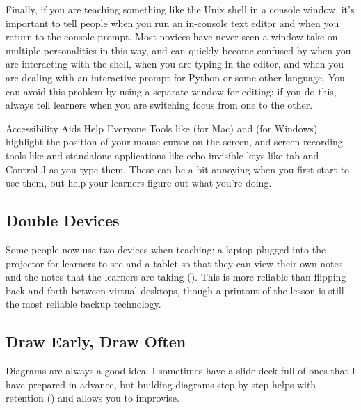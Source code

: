 Finally,
if you are teaching something like the Unix shell in a console window,
it's important to tell people when you run an in-console text editor
and when you return to the console prompt.
Most novices have never seen a window take on multiple personalities in this way,
and can quickly become confused by
when you are interacting with the shell,
when you are typing in the editor,
and when you are dealing with an interactive prompt for Python or some other language.
You can avoid this problem by using a separate window for editing;
if you do this,
always tell learners when you are switching focus from one to the other.

\begin{aside}{Accessibility Aids Help Everyone}
  Tools like  (for Mac)
  and  (for Windows)
  highlight the position of your mouse cursor on the screen,
  and screen recording tools like 
  and standalone applications like 
  echo invisible keys like tab and Control-J as you type them.
  These can be a bit annoying when you first start to use them,
  but help your learners figure out what you're doing.
\end{aside}

\subsection*{Double Devices}

Some people now use two devices when teaching:
a laptop plugged into the projector for learners to see
and a tablet so that they can view their own notes
and the notes that the learners are taking ().
This is more reliable than flipping back and forth between virtual desktops,
though a printout of the lesson is still the most reliable backup technology.

\subsection*{Draw Early, Draw Often}

Diagrams are always a good idea.
I sometimes have a slide deck full of ones that I have prepared in advance,
but building diagrams step by step helps with retention ()
and allows you to improvise.

